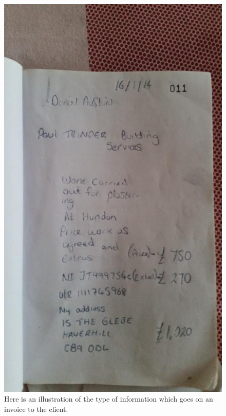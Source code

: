 \begin{figure}[H]
    \includegraphics[scale=0.5]{./Analysis/images/invoice2.jpg}
    \caption{Here is an illustration of the type of information which goes on an invoice to the client.} \label{fig:invoice}
\end{figure}


